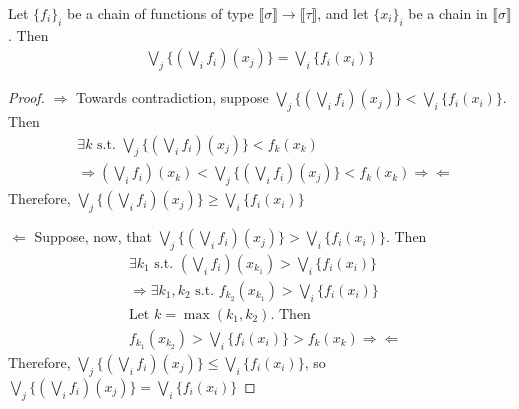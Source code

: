  \begin{lemma}
 Let $\{f_i\}_i$ be a chain of functions of type $\llbracket \sigma \rrbracket \to \llbracket \tau \rrbracket$, and let
 $\{x_i\}_i$ be a chain in $\llbracket \sigma \rrbracket$. Then
 \begin{align*}
 \bigvee_j\{(\bigvee_i f_i)(x_j)\} = \bigvee_i \{f_i (x_i)\}
 \end{align*}
 \end{lemma}
 \begin{proof}
 $\Rightarrow$ Towards contradiction, suppose $\bigvee_j\{(\bigvee_i f_i)(x_j)\} < \bigvee_i \{f_i (x_i)\}$. Then
 \begin{align*}
 &\exists k \text{ s.t. } \bigvee_j\{(\bigvee_i f_i)(x_j)\} < f_k(x_k) \\
 &\Rightarrow (\bigvee_i f_i)(x_k) < \bigvee_j\{(\bigvee_i f_i)(x_j)\} < f_k(x_k) \Rightarrow \Leftarrow
 \end{align*}
 Therefore, $\bigvee_j\{(\bigvee_i f_i)(x_j)\} \geq \bigvee_i \{f_i (x_i)\}$
 
$\Leftarrow$ Suppose, now, that $\bigvee_j\{(\bigvee_i f_i)(x_j)\} > \bigvee_i \{f_i (x_i)\}$. Then
 \begin{align*}
&\exists k_1 \text{ s.t. }  (\bigvee_i f_i)(x_{k_1})  >\bigvee_i \{f_i (x_i)\} \\
&\Rightarrow \exists k_1, k_2 \text{ s.t. }  f_{k_2} (x_{k_1}) >  \bigvee_i \{f_i (x_i)\}  \\
&\text{Let } k = \max(k_1,k_2). \text{ Then}\\
&f_{k_1}(x_{k_2}) > \bigvee_i\{f_i(x_i)\} >   f_k(x_k) \Rightarrow\Leftarrow
\end{align*}
Therefore, $\bigvee_j\{(\bigvee_i f_i)(x_j)\} \leq \bigvee_i \{f_i (x_i)\}$, so 
$\bigvee_j\{(\bigvee_i f_i)(x_j)\} = \bigvee_i \{f_i (x_i)\}$
 \end{proof}
 
